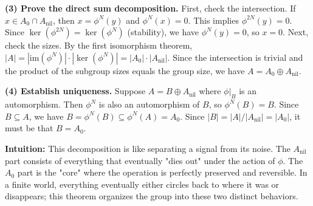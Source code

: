\begin{solution}
\textbf{(3) Prove the direct sum decomposition.}
First, check the intersection. If $x \in A_0 \cap A_{\text{nil}}$, then $x = \phi^N(y)$ and $\phi^N(x) = 0$.
This implies $\phi^{2N}(y) = 0$. Since $\ker(\phi^{2N}) = \ker(\phi^N)$ (stability), we have $\phi^N(y) = 0$, so $x = 0$.
Next, check the sizes. By the first isomorphism theorem, $|A| = |\text{im}(\phi^N)| \cdot |\ker(\phi^N)| = |A_0| \cdot |A_{\text{nil}}|$.
Since the intersection is trivial and the product of the subgroup sizes equals the group size, we have $A = A_0 \oplus A_{\text{nil}}$.

\textbf{(4) Establish uniqueness.}
Suppose $A = B \oplus A_{\text{nil}}$ where $\phi|_B$ is an automorphism.
Then $\phi^N$ is also an automorphism of $B$, so $\phi^N(B) = B$.
Since $B \subseteq A$, we have $B = \phi^N(B) \subseteq \phi^N(A) = A_0$.
Since $|B| = |A| / |A_{\text{nil}}| = |A_0|$, it must be that $B = A_0$.

\textbf{Intuition:}
This decomposition is like separating a signal from its noise. The $A_{\text{nil}}$ part consists of everything that eventually "dies out" under the action of $\phi$. The $A_0$ part is the "core" where the operation is perfectly preserved and reversible. In a finite world, everything eventually either circles back to where it was or disappears; this theorem organizes the group into these two distinct behaviors.
\end{solution}


